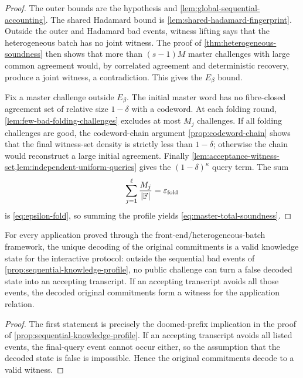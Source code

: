 \begin{proof}
The outer bounds are the hypothesis and \cref{lem:global-sequential-accounting}.  The shared Hadamard bound is \cref{lem:shared-hadamard-fingerprint}.  Outside the outer and Hadamard bad events, witness lifting says that the heterogeneous batch has no joint witness.  The proof of \cref{thm:heterogeneous-soundness} then shows that more than $(s-1)M$ master challenges with large common agreement would, by correlated agreement and deterministic recovery, produce a joint witness, a contradiction.  This gives the $E_\beta$ bound.

Fix a master challenge outside $E_\beta$.  The initial master word has no fibre-closed agreement set of relative size $1-\delta$ with a codeword.  At each folding round, \cref{lem:few-bad-folding-challenges} excludes at most $M_j$ challenges.  If all folding challenges are good, the codeword-chain argument \cref{prop:codeword-chain} shows that the final witness-set density is strictly less than $1-\delta$; otherwise the chain would reconstruct a large initial agreement.  Finally \cref{lem:acceptance-witness-set,lem:independent-uniform-queries} gives the $(1-\delta)^\kappa$ query term.  The sum
\[
  \sum_{j=1}^{\ell}\frac{M_j}{|\mathbb{F}|}
  =\varepsilon_{\mathrm{fold}}
\]
is \eqref{eq:epsilon-fold}, so summing the profile yields \eqref{eq:master-total-soundness}.
\end{proof}

\begin{corollary}
\label{cor:round-indexed-decoding-state}
For every application proved through the front-end/heterogeneous-batch framework, the unique decoding of the original commitments is a valid knowledge state for the interactive protocol: outside the sequential bad events of \cref{prop:sequential-knowledge-profile}, no public challenge can turn a false decoded state into an accepting transcript.  If an accepting transcript avoids all those events, the decoded original commitments form a witness for the application relation.
\end{corollary}

\begin{proof}
The first statement is precisely the doomed-prefix implication in the proof of \cref{prop:sequential-knowledge-profile}.  If an accepting transcript avoids all listed events, the final-query event cannot occur either, so the assumption that the decoded state is false is impossible.  Hence the original commitments decode to a valid witness.
\end{proof}

